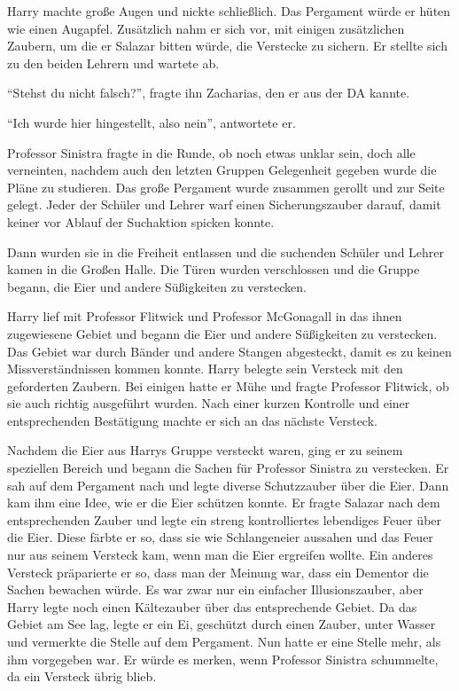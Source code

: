 Harry machte große Augen und nickte schließlich. Das Pergament würde er hüten wie einen Augapfel. Zusätzlich nahm er sich vor, mit einigen zusätzlichen Zaubern, um die er Salazar bitten würde, die Verstecke zu sichern. Er stellte sich zu den beiden Lehrern und wartete ab.

\enquote{Stehst du nicht falsch?}, fragte ihn Zacharias, den er aus der DA kannte.

\enquote{Ich wurde hier hingestellt, also nein}, antwortete er.

Professor Sinistra fragte in die Runde, ob noch etwas unklar sein, doch alle verneinten, nachdem auch den letzten Gruppen Gelegenheit gegeben wurde die Pläne zu studieren. Das große Pergament wurde zusammen gerollt und zur Seite gelegt. Jeder der Schüler und Lehrer warf einen Sicherungszauber darauf, damit keiner vor Ablauf der Suchaktion spicken konnte.

Dann wurden sie in die Freiheit entlassen und die suchenden Schüler und Lehrer kamen in die Großen Halle. Die Türen wurden verschlossen und die Gruppe begann, die Eier und andere Süßigkeiten zu verstecken.

Harry lief mit Professor Flitwick und Professor McGonagall in das ihnen zugewiesene Gebiet und begann die Eier und andere Süßigkeiten zu verstecken. Das Gebiet war durch Bänder und andere Stangen abgesteckt, damit es zu keinen Missverständnissen kommen konnte. Harry belegte sein Versteck mit den geforderten Zaubern. Bei einigen hatte er Mühe und fragte Professor Flitwick, ob sie auch richtig ausgeführt wurden. Nach einer kurzen Kontrolle und einer entsprechenden Bestätigung machte er sich an das nächste Versteck.

Nachdem die Eier aus Harrys Gruppe versteckt waren, ging er zu seinem speziellen Bereich und begann die Sachen für Professor Sinistra zu verstecken. Er sah auf dem Pergament nach und legte diverse Schutzzauber über die Eier. Dann kam ihm eine Idee, wie er die Eier schützen konnte. Er fragte Salazar nach dem entsprechenden Zauber und legte ein streng kontrolliertes lebendiges Feuer über die Eier. Diese färbte er so, dass sie wie Schlangeneier aussahen und das Feuer nur aus seinem Versteck kam, wenn man die Eier ergreifen wollte. Ein anderes Versteck präparierte er so, dass man der Meinung war, dass ein Dementor die Sachen bewachen würde. Es war zwar nur ein einfacher Illusionszauber, aber Harry legte noch einen Kältezauber über das entsprechende Gebiet. Da das Gebiet am See lag, legte er ein Ei, geschützt durch einen Zauber, unter Wasser und vermerkte die Stelle auf dem Pergament. Nun hatte er eine Stelle mehr, als ihm vorgegeben war. Er würde es merken, wenn Professor Sinistra schummelte, da ein Versteck übrig blieb.

